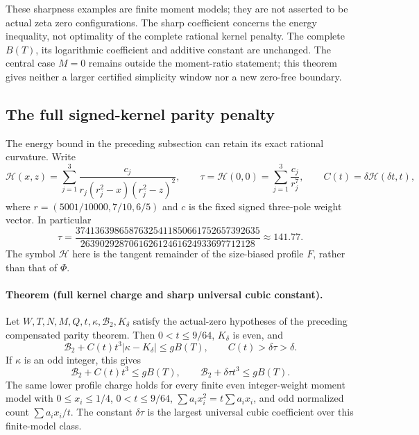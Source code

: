 These sharpness examples are finite moment models; they are not
asserted to be actual zeta zero configurations.  The sharp coefficient
concerns the energy inequality, not optimality of the complete rational
kernel penalty.  The complete \(B(T)\), its logarithmic coefficient
and additive constant are unchanged.  The central case \(M=0\) remains
outside the moment-ratio statement; this theorem gives neither a larger
certified simplicity window nor a new zero-free boundary.

\subsection{The full signed-kernel parity penalty}
\label{sec:full-kernel-parity}

The energy bound in the preceding subsection can retain its exact
rational curvature.  Write
\[
 \mathcal H(x,z)=
 \sum_{j=1}^3\frac{c_j}{r_j(r_j^2-x)(r_j^2-z)^2},
 \qquad
 \tau=\mathcal H(0,0)=\sum_{j=1}^3\frac{c_j}{r_j^7},
 \qquad
 C(t)=\delta\mathcal H(\delta t,t),
\]
where \(r=(5001/10000,7/10,6/5)\) and \(c\) is the fixed signed
three-pole weight vector.  In particular
\[
 \tau=
 \frac{37413639865876325411850661752657392635}
      {263902928706162612461624933697712128}
 \approx141.77.
\]
The symbol \(\mathcal H\) here is the tangent remainder of the
size-biased profile \(F\), rather than that of \(\Phi\).

\paragraph{Theorem (full kernel charge and sharp universal cubic constant).}
Let \(W,T,N,M,Q,t,\kappa,\mathcal B_2,K_\delta\) satisfy the
actual-zero hypotheses of the preceding compensated parity theorem.
Then \(0<t\le9/64\), \(K_\delta\) is even, and
\begin{equation}
 \mathcal B_2+C(t)t^3|\kappa-K_\delta|\le gB(T),
 \qquad C(t)>\delta\tau>\delta.
 \label{eq:full-kernel-parity}
\end{equation}
If \(\kappa\) is an odd integer, this gives
\begin{equation}
 \mathcal B_2+C(t)t^3\le gB(T),\qquad
 \mathcal B_2+\delta\tau t^3\le gB(T).
 \label{eq:full-kernel-parity-odd}
\end{equation}
The same lower profile charge holds for every finite even integer-weight
moment model with \(0\le x_i\le1/4\), \(0<t\le9/64\),
\(\sum a_i x_i^2=t\sum a_i x_i\), and odd normalized count
\(\sum a_i x_i/t\).  The constant \(\delta\tau\) is the largest
universal cubic coefficient over this finite-model class.

